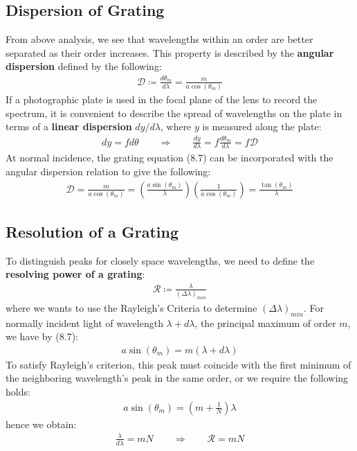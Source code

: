 \documentclass[11pt]{book}
\theoremstyle{break}
\theoremstyle{break}
\begin{document}
\subsection{Dispersion of Grating}
From above analysis, we see that wavelengths within an order are better separated as their order increases. This property is described by the \textbf{angular dispersion} defined by the following:
\begin{align*}
\mathcal{D} \coloneqq \frac{d\theta_m}{d\lambda} = \frac{m}{a\cos(\theta_m)}
\end{align*}
If a photographic plate is used in the focal plane of the lens to record the spectrum, it is convenient to describe the spread of wavelengths on the plate in terms of a \textbf{linear dispersion} $dy/d\lambda$, where $y$ is measured along the plate:
\begin{align*}
dy = fd\theta \qquad \Rightarrow \qquad \frac{dy}{d\lambda} =f\frac{d\theta_m}{d\lambda} = f\mathcal{D}
\end{align*}
At normal incidence, the grating equation (8.7) can be incorporated with the angular dispersion relation to give the following:
\begin{align*}
\mathcal{D} = \frac{m}{a\cos(\theta_m)} = \left( \frac{a\sin(\theta_m)}{\lambda}\right) \left( \frac{1}{a\cos(\theta_m)}\right) = \frac{\tan(\theta_m)}{\lambda}
\end{align*}
\subsection{Resolution of a Grating}
To distinguish peaks for closely space wavelengths, we need to define the \textbf{resolving power of a grating}:
\begin{align*}
\mathcal{R} \coloneqq \frac{\lambda}{(\Delta\lambda)_{min}}
\end{align*}
where we wants to use the Rayleigh's Criteria to determine $(\Delta \lambda)_{min}$. For normally incident light of wavelength $\lambda + d\lambda$, the principal maximum of order $m$, we have by (8.7):
\begin{align*}
a\sin(\theta_m) = m(\lambda + d\lambda)
\end{align*}
To satisfy Rayleigh's criterion, this peak must coincide with the first minimum of the neighboring wavelength’s peak in the same order, or we require the following holds:
\begin{align*}
a\sin(\theta_m) = \left( m + \frac{1}{N}\right)\lambda
\end{align*}
hence we obtain:
\begin{align*}
\frac{\lambda}{d\lambda} = mN \qquad \Rightarrow \qquad \mathcal{R} = mN
\end{align*}
\end{document}
